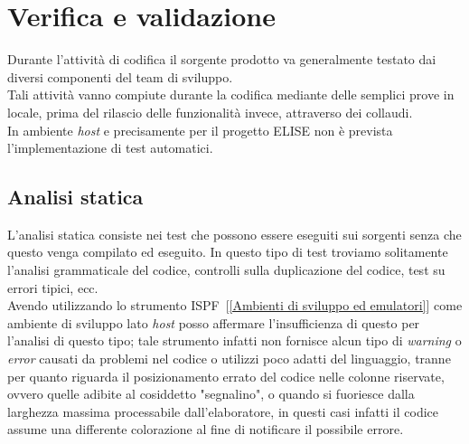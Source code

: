 \section{Verifica e validazione}

Durante l'attività di codifica il sorgente prodotto va generalmente testato dai diversi componenti del team di sviluppo.\\

Tali attività vanno compiute durante la codifica mediante delle semplici prove in locale, prima del rilascio delle funzionalità invece, attraverso dei collaudi.\\

In ambiente \textit{host} e precisamente per il progetto ELISE non è prevista l'implementazione di test automatici.\\

\subsection{Analisi statica}

L'analisi statica consiste nei test che possono essere eseguiti sui sorgenti senza che questo venga compilato ed eseguito. In questo tipo di test troviamo solitamente l'analisi grammaticale del codice, controlli sulla duplicazione del codice, test su errori tipici, ecc.\\

Avendo utilizzando lo strumento ISPF\glossario\ [\ref{Ambienti di sviluppo ed emulatori}] come ambiente di sviluppo lato \textit{host} posso affermare l'insufficienza di questo per l'analisi di questo tipo; tale strumento infatti non fornisce alcun tipo di \textit{warning} o \textit{error} causati da problemi nel codice o utilizzi poco adatti del linguaggio, tranne per quanto riguarda il posizionamento errato del codice nelle colonne riservate, ovvero quelle adibite al cosiddetto "segnalino", o quando si fuoriesce dalla larghezza massima processabile dall'elaboratore, in questi casi infatti il codice assume una differente colorazione al fine di notificare il possibile errore.\\

